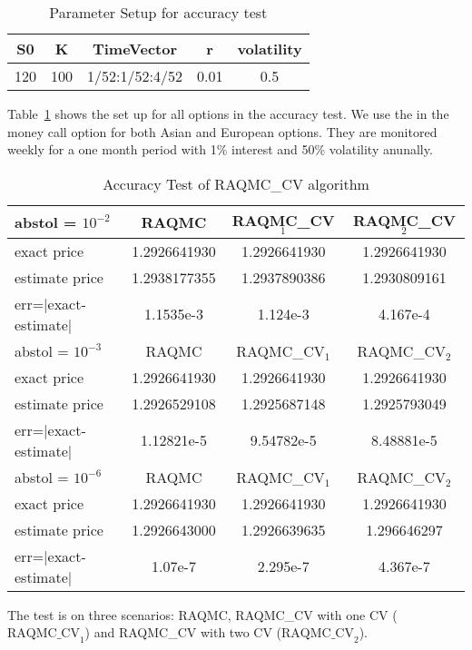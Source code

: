 \begin{table}[h]
    \centering
	\caption{Parameter Setup for accuracy test}
    \label{tb:accsetup}
	\begin{tabular}{ccccc}
		\hline\hline
        S0 & K & TimeVector & r & volatility \\[0.5ex]
        \hline
        120  & 100 & 1/52:1/52:4/52 & 0.01 & 0.5 \\[1ex] 
        \hline
	\end{tabular}
\end{table}
Table~\ref{tb:accsetup} shows the set up for all options in the accuracy test.
We use the in the money call option for both Asian and European options. 
They are monitored weekly for a one month period with 1\% interest and 50\% volatility anunally. 
\begin{table}[h]
    \centering
	\caption{Accuracy Test of RAQMC\_CV algorithm}
    \label{tb:accuracy}
    \begin{tabular}{lccc}  
    \hline \hline
    abstol = $10^{-2}$ &RAQMC&RAQMC\_CV$_1$&RAQMC\_CV$_2$\\[0.5ex]
    \hline
    exact price& 1.2926641930& 1.2926641930&1.2926641930\\[0.5ex]
    estimate price& 1.2938177355& 1.2937890386&1.2930809161\\[0.5ex]
    err=$|$exact-estimate$|$ & 1.1535e-3& 1.124e-3&4.167e-4\\[0.5ex]
    \hline
    abstol = $10^{-3}$ &RAQMC&RAQMC\_CV$_1$&RAQMC\_CV$_2$\\[0.5ex]
    \hline
    exact price& 1.2926641930& 1.2926641930&1.2926641930\\[0.5ex]
    estimate price& 1.2926529108& 1.2925687148&1.2925793049\\[0.5ex]
    err=$|$exact-estimate$|$ & 1.12821e-5& 9.54782e-5&8.48881e-5\\[0.5ex]
    \hline
    abstol = $10^{-6}$ & RAQMC&RAQMC\_CV$_1$&RAQMC\_CV$_2$\\[0.5ex]
    \hline
    exact price& 1.2926641930& 1.2926641930&1.2926641930\\[0.5ex]
    estimate price& 1.2926643000& 1.2926639635&1.296646297\\[0.5ex]
    err=$|$exact-estimate$|$ & 1.07e-7& 2.295e-7&4.367e-7\\[0.5ex]
    \hline
    \end{tabular}
\end{table}
The test is on three scenarios: RAQMC, RAQMC\_CV with one CV ($\textrm{RAQMC\_CV}_1$) and RAQMC\_CV with two CV ($\textrm{RAQMC\_CV}_2$).
